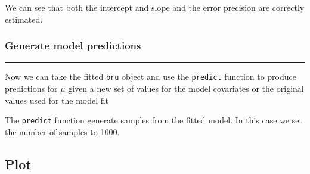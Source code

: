 \documentclass[
  letterpaper,
  DIV=11,
  numbers=noendperiod]{scrartcl}
\newenvironment{Shaded}{\begin{snugshade}}{\end{snugshade}}
\newcommand{\AttributeTok}[1]{\textcolor[rgb]{0.40,0.45,0.13}{#1}}
\newcommand{\ConstantTok}[1]{\textcolor[rgb]{0.56,0.35,0.01}{#1}}
\newcommand{\DecValTok}[1]{\textcolor[rgb]{0.68,0.00,0.00}{#1}}
\newcommand{\FunctionTok}[1]{\textcolor[rgb]{0.28,0.35,0.67}{#1}}
\newcommand{\NormalTok}[1]{\textcolor[rgb]{0.00,0.23,0.31}{#1}}
\newcommand{\OtherTok}[1]{\textcolor[rgb]{0.00,0.23,0.31}{#1}}
\newcommand{\SpecialCharTok}[1]{\textcolor[rgb]{0.37,0.37,0.37}{#1}}
\begin{document}
We can see that both the intercept and slope and the error precision are
correctly estimated.

\subsubsection{Generate model
predictions}\label{generate-model-predictions}

\begin{center}\rule{0.5\linewidth}{0.5pt}\end{center}

Now we can take the fitted \texttt{bru} object and use the
\texttt{predict} function to produce predictions for \(\mu\) given a new
set of values for the model covariates or the original values used for
the model fit

\begin{Shaded}
\end{Shaded}

The \texttt{predict} function generate samples from the fitted model. In
this case we set the number of samples to 1000.

\subsection{Plot}
\end{document}
